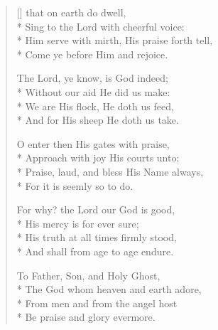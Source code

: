 \newHymn
{}
\begin{verse}[\versewidth]
 that on earth do dwell,\\*
Sing to the Lord with cheerful voice:\\*
Him serve with mirth, His praise forth tell,\\*
Come ye before Him and rejoice.

The Lord, ye know, is God indeed;\\*
Without our aid He did us make:\\*
We are His flock, He doth us feed,\\*
And for His sheep He doth us take.

O enter then His gates with praise,\\*
Approach with joy His courts unto;\\*
Praise, laud, and bless His Name always,\\*
For it is seemly so to do.

For why? the Lord our God is good,\\*
His mercy is for ever sure;\\*
His truth at all times firmly stood,\\*
And shall from age to age endure.

To Father, Son, and Holy Ghost,\\*
The God whom heaven and earth adore,\\*
From men and from the angel host\\*
Be praise and glory evermore. 

\end{verse}


